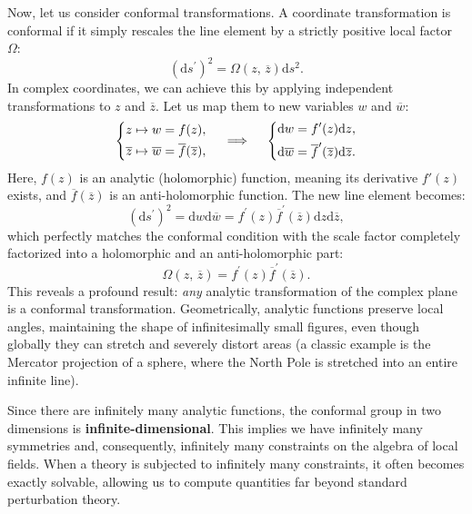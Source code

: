Now, let us consider conformal transformations. A coordinate transformation is conformal if it simply rescales the line element by a strictly positive local factor \(\Omega\):
\[
    (\mathrm{d}s^{\prime})^2 =  \Omega(z, \, \overline{z}) \mathrm{d} s^2.
\]
In complex coordinates, we can achieve this by applying independent transformations to \(z\) and \(\overline{z}\). Let us map them to new variables \(w\) and \(\overline{w}\):
\[
    \begin{dcases}
        z \mapsto w = f(z), \\
        \overline{z} \mapsto \overline{w} = \overline{f}(\overline{z}),
    \end{dcases} \quad \implies \quad \begin{dcases}
        \mathrm{d} w = f^{\prime}(z) \mathrm{d} z, \\
        \mathrm{d} \overline{w} = \overline{f}^{\prime}(\overline{z}) \mathrm{d} \overline{z}.
    \end{dcases}
\]
Here, \(f(z)\) is an analytic (holomorphic) function, meaning its derivative \(f'(z)\) exists, and \(\overline{f}(\overline{z})\) is an anti-holomorphic function. The new line element becomes:
\[
    (\mathrm{d} s^{\prime} )^2 = \mathrm{d} w \mathrm{d} \overline{w} = f^{\prime}(z) \overline{f}^{\prime}(\overline{z}) \mathrm{d} z \mathrm{d} \overline{z},
\]
which perfectly matches the conformal condition with the scale factor completely factorized into a holomorphic and an anti-holomorphic part:
\[
    \Omega(z, \, \overline{z}) = f^{\prime}(z) \overline{f}^{\prime}(\overline{z}).
\]
This reveals a profound result: \textit{any} analytic transformation of the complex plane is a conformal transformation. Geometrically, analytic functions preserve local angles, maintaining the shape of infinitesimally small figures, even though globally they can stretch and severely distort areas (a classic example is the Mercator projection of a sphere, where the North Pole is stretched into an entire infinite line).

Since there are infinitely many analytic functions, the conformal group in two dimensions is \textbf{infinite-dimensional}. This implies we have infinitely many symmetries and, consequently, infinitely many constraints on the algebra of local fields. When a theory is subjected to infinitely many constraints, it often becomes exactly solvable, allowing us to compute quantities far beyond standard perturbation theory.

